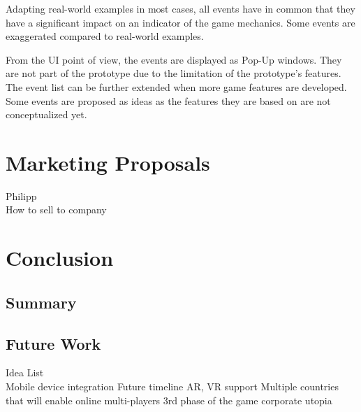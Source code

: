 \documentclass[11pt,titlepage,oneside,openany]{book}
\begin{document}
Adapting real-world examples in most cases, all events have in common that they have a significant impact on an indicator of the game mechanics. Some events are exaggerated compared to real-world examples. 




From the UI point of view, the events are displayed as Pop-Up windows. They are not part of the prototype due to the limitation of the prototype's features. The event list can be further extended when more game features are developed. Some events are proposed as ideas as the features they are based on are not conceptualized yet.




\chapter{Marketing Proposals}
Philipp\\
\label{cha:exp}
\label{sec:setting}
How to sell to company


\chapter{Conclusion}
\label{cha:conclusion}


\section{Summary}
\label{sec:sum}

\section{Future Work}
\label{sec:future}
Idea List\\
Mobile device integration
Future timeline
AR, VR support
Multiple countries that will enable online multi-players
3rd phase of the game corporate utopia


\end{document}
